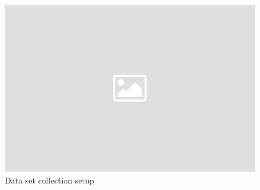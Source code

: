 \begin{figure}[!htb]
	\centering
		\includegraphics[width=\textwidth]{bilder/placeholder.png}
		\caption{Data set collection setup}
		\label{fig:setup}
\end{figure}